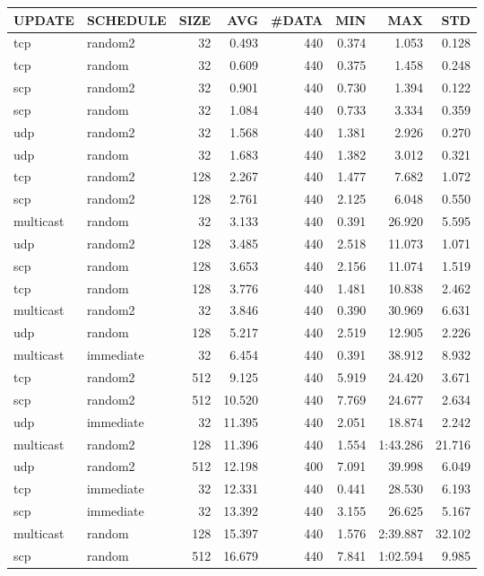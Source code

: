 \begin{tabular}{|l|l|r|r|r|r|r|r|}
\hline
UPDATE & SCHEDULE & SIZE & AVG & \#DATA & MIN & MAX & STD\\
\hline
tcp & random2 & 32 & 0.493 & 440 & 0.374 & 1.053 & 0.128\\
tcp & random & 32 & 0.609 & 440 & 0.375 & 1.458 & 0.248\\
scp & random2 & 32 & 0.901 & 440 & 0.730 & 1.394 & 0.122\\
scp & random & 32 & 1.084 & 440 & 0.733 & 3.334 & 0.359\\
udp & random2 & 32 & 1.568 & 440 & 1.381 & 2.926 & 0.270\\
udp & random & 32 & 1.683 & 440 & 1.382 & 3.012 & 0.321\\
tcp & random2 & 128 & 2.267 & 440 & 1.477 & 7.682 & 1.072\\
scp & random2 & 128 & 2.761 & 440 & 2.125 & 6.048 & 0.550\\
multicast & random & 32 & 3.133 & 440 & 0.391 & 26.920 & 5.595\\
udp & random2 & 128 & 3.485 & 440 & 2.518 & 11.073 & 1.071\\
scp & random & 128 & 3.653 & 440 & 2.156 & 11.074 & 1.519\\
tcp & random & 128 & 3.776 & 440 & 1.481 & 10.838 & 2.462\\
multicast & random2 & 32 & 3.846 & 440 & 0.390 & 30.969 & 6.631\\
udp & random & 128 & 5.217 & 440 & 2.519 & 12.905 & 2.226\\
multicast & immediate & 32 & 6.454 & 440 & 0.391 & 38.912 & 8.932\\
tcp & random2 & 512 & 9.125 & 440 & 5.919 & 24.420 & 3.671\\
scp & random2 & 512 & 10.520 & 440 & 7.769 & 24.677 & 2.634\\
udp & immediate & 32 & 11.395 & 440 & 2.051 & 18.874 & 2.242\\
multicast & random2 & 128 & 11.396 & 440 & 1.554 & 1:43.286 & 21.716\\
udp & random2 & 512 & 12.198 & 400 & 7.091 & 39.998 & 6.049\\
tcp & immediate & 32 & 12.331 & 440 & 0.441 & 28.530 & 6.193\\
scp & immediate & 32 & 13.392 & 440 & 3.155 & 26.625 & 5.167\\
multicast & random & 128 & 15.397 & 440 & 1.576 & 2:39.887 & 32.102\\
scp & random & 512 & 16.679 & 440 & 7.841 & 1:02.594 & 9.985\\

\end{tabular}
